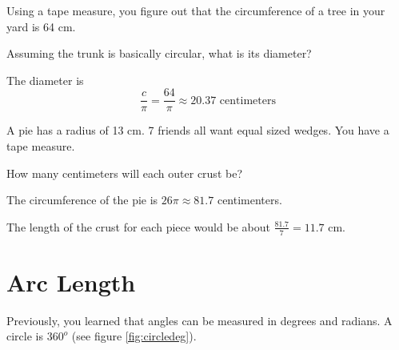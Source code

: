 \begin{Exercise}[title={Circumference}, label=circumference]

  Using a tape measure, you figure out that the circumference of a tree in your
  yard is 64 cm.

  Assuming the trunk is basically circular,  what is its diameter?
  
\end{Exercise}
\begin{Answer}[ref=circumference]

  The diameter is $$\frac{c}{\pi} = \frac{64}{\pi} \approx 20.37 \text{ 
  centimeters}$$
  
\end{Answer}
\begin{Exercise}[title={Splitting a Pie}, label=pie_splitting]

  A pie has a radius of 13 cm.  7 friends all want equal sized wedges.  You 
  have a tape measure.

  How many centimeters will each outer crust be?

\end{Exercise}
\begin{Answer}[ref=pie_splitting]

  The circumference of the pie is $26 \pi \approx 81.7$ centimenters.
  
  The length of the crust for each piece would be about $\frac{81.7}{7} = 11.7$
  cm.

  
\end{Answer}

\section{Arc Length}
Previously, you learned that angles can be measured in degrees and radians. A 
circle is $360^o$ (see figure \ref{fig:circledeg}). 

